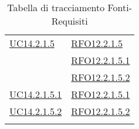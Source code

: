 \begin{longtable}{|>{\centering}m{5cm}|m{5cm}<{\centering}|}
\hyperlink{UC14.2.1.5}{UC14.2.1.5}
& \hyperlink{RFO12.2.1.5}{RFO12.2.1.5}\\
& \hyperlink{RFO12.2.1.5.1}{RFO12.2.1.5.1}\\
& \hyperlink{RFO12.2.1.5.2}{RFO12.2.1.5.2}\\\hline

\hyperlink{UC14.2.1.5.1}{UC14.2.1.5.1} & \hyperlink{RFO12.2.1.5.1}{RFO12.2.1.5.1}\\\hline
\hyperlink{UC14.2.1.5.2}{UC14.2.1.5.2} & \hyperlink{RFO12.2.1.5.2}{RFO12.2.1.5.2}\\\hline

\caption[Tabella di tracciamento Fonti-Requisiti]{Tabella di tracciamento Fonti-Requisiti}
\label{tabella:fonti-requi}
\end{longtable}
\clearpage
